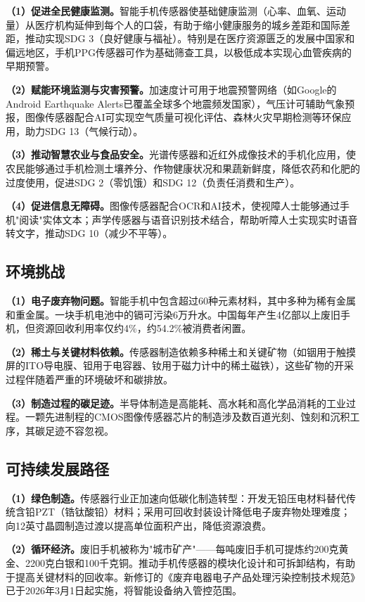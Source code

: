 \documentclass[12pt, a4paper]{ctexart}
\begin{document}
\textbf{（1）促进全民健康监测。}智能手机传感器使基础健康监测（心率、血氧、运动量）从医疗机构延伸到每个人的口袋，有助于缩小健康服务的城乡差距和国际差距，推动实现SDG 3（良好健康与福祉）。特别是在医疗资源匮乏的发展中国家和偏远地区，手机PPG传感器可作为基础筛查工具，以极低成本实现心血管疾病的早期预警。

\textbf{（2）赋能环境监测与灾害预警。}加速度计可用于地震预警网络（如Google的Android Earthquake Alerts已覆盖全球多个地震频发国家），气压计可辅助气象预报，图像传感器配合AI可实现空气质量可视化评估、森林火灾早期检测等环保应用，助力SDG 13（气候行动）。

\textbf{（3）推动智慧农业与食品安全。}光谱传感器和近红外成像技术的手机化应用，使农民能够通过手机检测土壤养分、作物健康状况和果蔬新鲜度，降低农药和化肥的过度使用，促进SDG 2（零饥饿）和SDG 12（负责任消费和生产）。

\textbf{（4）促进信息无障碍。}图像传感器配合OCR和AI技术，使视障人士能够通过手机"阅读"实体文本；声学传感器与语音识别技术结合，帮助听障人士实现实时语音转文字，推动SDG 10（减少不平等）。

\subsection{环境挑战}

\textbf{（1）电子废弃物问题。}智能手机中包含超过60种元素材料\cite{stcn2025}，其中多种为稀有金属和重金属。一块手机电池中的镉可污染6万升水\cite{ndrc2022}。中国每年产生4亿部以上废旧手机，但资源回收利用率仅约4\%，约54.2\%被消费者闲置\cite{stcn2025}。

\textbf{（2）稀土与关键材料依赖。}传感器制造依赖多种稀土和关键矿物（如铟用于触摸屏的ITO导电膜、钽用于电容器、钕用于磁力计中的稀土磁铁），这些矿物的开采过程伴随着严重的环境破坏和碳排放。

\textbf{（3）制造过程的碳足迹。}半导体制造是高能耗、高水耗和高化学品消耗的工业过程。一颗先进制程的CMOS图像传感器芯片的制造涉及数百道光刻、蚀刻和沉积工序，其碳足迹不容忽视。

\subsection{可持续发展路径}

\textbf{（1）绿色制造。}传感器行业正加速向低碳化制造转型\cite{innosensor2025}：开发无铅压电材料替代传统含铅PZT（锆钛酸铅）材料；采用可回收封装设计降低电子废弃物处理难度；向12英寸晶圆制造过渡以提高单位面积产出，降低资源浪费。

\textbf{（2）循环经济。}废旧手机被称为"城市矿产"——每吨废旧手机可提炼约200克黄金、2200克白银和100千克铜\cite{stcn2025}。推动手机传感器的模块化设计和可拆卸结构，有助于提高关键材料的回收率。新修订的《废弃电器电子产品处理污染控制技术规范》已于2026年3月1日起实施，将智能设备纳入管控范围\cite{jingji2026}。
\end{document}
